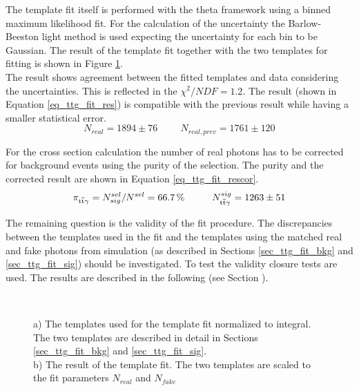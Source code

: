 The template fit itself is performed with the theta framework \cite{theta} using a binned maximum likelihood fit. For the calculation of the uncertainty the Barlow-Beeston light method is used \cite{Barlow:1993dm} \cite{2011arXiv1103.0354C} expecting the uncertainty for each bin to be Gaussian. The result of the template fit together with the two templates for fitting is shown in Figure \ref{fig_ttg_fit_res}.\\
The result shows agreement between the fitted templates and data considering the uncertainties. This is  reflected in the $\chi^2 / NDF = 1.2$. The result (shown in Equation \ref{eq_ttg_fit_res}) is compatible with the previous result \cite{CMS-PAS-TOP-13-011} while having a smaller statistical error. \\

\begin{equation}
N_{real} = 1894 \pm 76 \hspace{1cm} N_{real,prev} = 1761 \pm 120
\label{eq_ttg_fit_res}
\end{equation}

For the cross section calculation the number of real photons has to be corrected for background events using the purity of the selection.
The purity and the corrected result are shown in Equation \ref{eq_ttg_fit_rescor}.\\

\begin{equation}
\pi_{\mathrm{t}\overline{\mathrm{t}} \gamma} = N^{sel}_{sig} / N^{sel} = \SI{66.7}{\percent} \hspace{1cm} N^{sig}_{\mathrm{t}\overline{\mathrm{t}} \gamma} = 1263 \pm 51
\label{eq_ttg_fit_rescor}
\end{equation}

The remaining question is the validity of the fit procedure. The discrepancies between the templates used in the fit and the templates using the matched real and fake photons from simulation (as described in Sections \ref{sec_ttg_fit_bkg} and \ref{sec_ttg_fit_sig}) should be investigated. To test the validity closure tests are used. The results are described in the following (see Section ).

\begin{figure}[ht]
\centering
  \\
  \caption{a) The templates used for the template fit normalized to integral. The two templates are described in detail in Sections \ref{sec_ttg_fit_bkg} and \ref{sec_ttg_fit_sig}.\\ b) The result of the template fit. The two templates are scaled to the fit parameters $N_{real}$ and $N_{fake}$}
  \label{fig_ttg_fit_res}
\end{figure}

